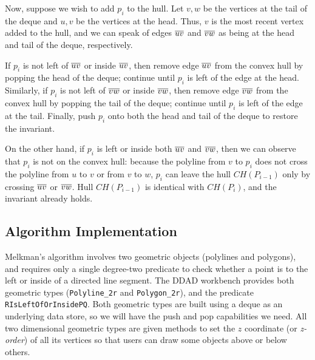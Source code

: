 Now, suppose we wish to add $p_i$ to the hull. Let $v, w$ be the vertices at the
tail of the deque and $u, v$ be the vertices at the head. Thus, $v$ is the most
recent vertex added to the hull, and we can speak of edges $\seg{uv}$ and
$\seg{vw}$ as being at the head and tail of the deque, respectively. 

If $p_i$ is not left of $\seg{uv}$ or inside $\seg{uv}$, then remove edge
$\seg{uv}$ from the convex hull by popping the head of the deque; continue until
$p_i$ is left of the edge at the head. Similarly, if $p_i$ is not left of
$\seg{vw}$ or inside $\seg{vw}$, then remove edge $\seg{vw}$ from the convex
hull by popping the tail of the deque; continue until $p_i$ is left of the edge
at the tail. Finally, push $p_i$ onto both the head and tail of the deque to
restore the invariant.

On the other hand, if $p_i$ is left or inside both $\seg{uv}$ and $\seg{vw}$,
then we can observe that $p_i$ is not on the convex hull: because the polyline
from $v$ to $p_i$ does not cross the polyline from $u$ to $v$ or from $v$ to
$w$, $p_i$ can leave the hull $CH(P_{i-1})$ only by crossing $\seg{uv}$ or
$\seg{vw}$. Hull $CH(P_{i-1})$ is identical with $CH(P_i)$, and the invariant
already holds.



\subsection{Algorithm Implementation}

Melkman's algorithm involves two geometric objects (polylines and polygons), and
requires only a single degree-two predicate to check whether a point is to the
left or inside of a directed line segment. The DDAD workbench provides both
geometric types (\texttt{Polyline\_2r} and \texttt{Polygon\_2r}), and the
predicate \texttt{RIsLeftOfOrInsidePQ}. Both geometric types are built using a
deque as an underlying data store, so we will have the push and pop
capabilities we need. All two dimensional geometric types are given methods to
set the $z$ coordinate (or \emph{z-order}) of all its vertices so that users can
draw some objects above or below others. 

